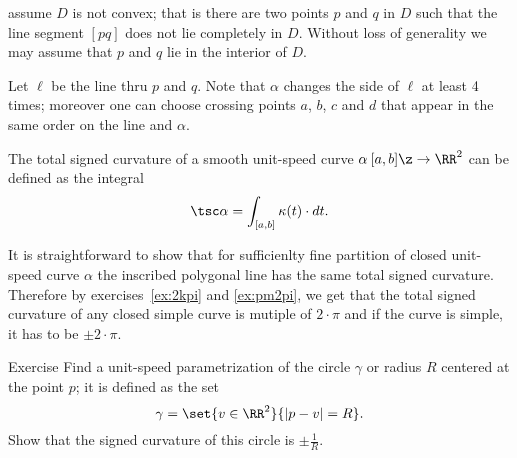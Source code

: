  assume $D$ is not convex; that is there are two points $p$ and $q$ in $D$ such that the line segment $[pq]$ does not lie completely in $D$.
Without loss of generality we may assume that $p$ and $q$ lie in the interior of $D$.

Let $\ell$ be the line thru $p$ and $q$.
Note that $\alpha$ changes the side of $\ell$ at least 4 times;
moreover one can choose crossing points $a$, $b$, $c$ and $d$ that appear in the same order on the line and $\alpha$.













The total signed curvature of a smooth unit-speed curve $\alpha\:[a,b]\z\to\RR^2$ can be defined as the integral
\[\tsc\alpha=\int_{[a,b]}\kappa(t)\cdot dt.\]

It is straightforward to show that for sufficienlty fine partition of closed unit-speed curve $\alpha$ the inscribed polygonal line has the same total signed curvature.
Therefore by exercises~\ref{ex:2kpi} and \ref{ex:pm2pi},
we get that the total signed curvature of any closed simple curve is mutiple of $2\cdot\pi$ and if the curve is simple, it has to be $\pm2\cdot\pi$.

\begin{thm}{Exercise}\label{ex:curvature-of-circle}
Find a unit-speed parametrization of the circle $\gamma$ or radius $R$ centered at the point $p$;
it is defined as the set 
\[\gamma=\set{v\in\RR^2}{|p-v|=R}.\]
Show that the signed curvature of this circle is $\pm \tfrac1R$.
\end{thm}
